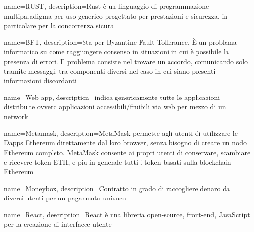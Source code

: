 {
	name={RUST},
	description={Rust è un linguaggio di programmazione multiparadigma per uso generico progettato per prestazioni e sicurezza, in particolare per la concorrenza sicura}
}

{
	name={BFT},
	description={Sta per Byzantine Fault Tollerance. È un problema informatico su come raggiungere consenso in situazioni in cui è possibile la presenza di errori. Il problema consiste nel trovare un accordo, comunicando solo tramite messaggi, tra componenti diversi nel caso in cui siano presenti informazioni discordanti}
}

{
	name={Web app},
	description={indica genericamente tutte le applicazioni distribuite ovvero applicazioni accessibili/fruibili via web per mezzo di un network}
}

{
	name={Metamask},
	description={MetaMask permette agli utenti di utilizzare le Dapps Ethereum direttamente dal loro browser, senza bisogno di creare un nodo Ethereum completo. MetaMask consente ai propri utenti di conservare, scambiare e ricevere token ETH, e più in generale tutti i token basati sulla blockchain Ethereum}
}

{
	name={Moneybox},
	description={Contratto in grado di raccogliere denaro da diversi utenti per un pagamento univoco}
}

{
	name={React},
	description={React è una libreria open-source, front-end, JavaScript per la creazione di interfacce utente}
}

